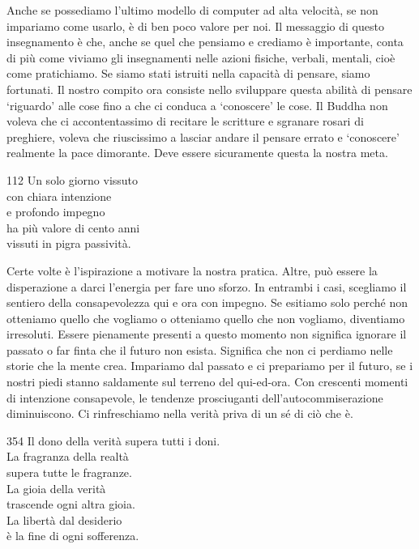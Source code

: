\begin{dhpRefl}
Anche se possediamo l'ultimo modello di computer ad alta velocit\`{a}, se non impariamo come usarlo, \`{e} di ben poco valore per noi. Il messaggio di questo insegnamento \`{e} che, anche se quel che pensiamo e crediamo \`{e} importante, conta di più come viviamo gli insegnamenti nelle azioni fisiche, verbali, mentali, cio\`{e} come pratichiamo. Se siamo stati istruiti nella capacit\`{a} di pensare, siamo fortunati. Il nostro compito ora consiste nello sviluppare questa abilit\`{a} di pensare `riguardo' alle cose fino a che ci conduca a `conoscere' le cose. Il Buddha non voleva che ci accontentassimo di recitare le scritture e sgranare rosari di preghiere, voleva che riuscissimo a lasciar andare il pensare errato e `conoscere' realmente la pace dimorante. Deve essere sicuramente questa la nostra meta.
\end{dhpRefl}


\begin{dhpVerse}{112}
\label{dhp-112}
Un solo giorno vissuto\\
con chiara intenzione\\
e profondo impegno\\
ha più valore di cento anni\\
vissuti in pigra passivit\`{a}.
\end{dhpVerse}

\begin{dhpRefl}
Certe volte \`{e} l'ispirazione a motivare la nostra pratica. Altre, pu\`{o} essere la disperazione a darci l'energia per fare uno sforzo. In entrambi i casi, scegliamo il sentiero della consapevolezza qui e ora con impegno. Se esitiamo solo perch\'{e} non otteniamo quello che vogliamo o otteniamo quello che non vogliamo, diventiamo irresoluti. Essere pienamente presenti a questo momento non significa ignorare il passato o far finta che il futuro non esista. Significa che non ci perdiamo nelle storie che la mente crea. Impariamo dal passato e ci prepariamo per il futuro, se i nostri piedi stanno saldamente sul terreno del qui-ed-ora. Con crescenti momenti di intenzione consapevole, le tendenze prosciuganti dell'autocommiserazione diminuiscono. Ci rinfreschiamo nella verit\`{a} priva di un s\'{e} di ci\`{o} che \`{e}. 
\end{dhpRefl}


\begin{dhpVerse}{354}
\label{dhp-354}
Il dono della verit\`{a} supera tutti i doni.\\
La fragranza della realt\`{a}\\
supera tutte le fragranze.\\
La gioia della verit\`{a}\\
trascende ogni altra gioia.\\
La libert\`{a} dal desiderio\\
\`{e} la fine di ogni sofferenza.
\end{dhpVerse}

